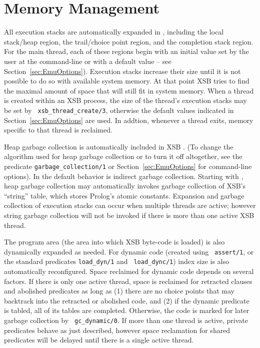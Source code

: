 
\section{Memory Management}\label{memory_management}
All execution stacks are automatically expanded in \version{},
including the local stack/heap region, the trail/choice point region,
and the completion stack region.  For the main thread, each of these
regions begin with an initial value set by the user at the
command-line or with a default value -- see
Section~\ref{sec:EmuOptions}).  Execution stacks increase their size
until it is not possible to do so with available system memory.  At
that point XSB tries to find the maximal amount of space that will
still fit in system memory.  When a thread is created within an XSB
process, the size of the thread's execution stacks may be set by {\tt
  xsb\_thread\_create/3}, otherwise the default values indicated in
Section~\ref{sec:EmuOptions} are used.  In addtion, whenever a thread
exits, memory specific to that thread is reclaimed.

Heap garbage collection is automatically included in XSB
\cite{CaSC01,CATmem@ISMM-98}.  (To change the algorithm used for heap
garbage collection or to turn it off altogether, see the predicate
{\tt garbage\_collection/1} or Section~\ref{sec:EmuOptions} for
command-line options).  In \version{} the default behavior is indirect
garbage collection.  Starting with \version{}, heap garbage collection
may automatically invokes garbage collection of XSB's ``string''
table, which stores Prolog's atomic constants.  Expansion and garbage
collection of execution stacks can occur when multiple threads are
active; however string garbage collection will not be invoked if there
is more than one active XSB thread.

The program area (the area into which XSB byte-code is loaded) is also
dynamically expanded as needed.  For dynamic code (created using {\tt
  assert/1}, or the standard predicates {\tt load\_dyn/1} and {\tt
  load\_dync/1}) index size is also automatically reconfigured.  Space
reclaimed for dynamic code depends on several factors.  If there is
only one active thread, space is reclaimed for retracted clauses and
abolished predicates as long as (1) there are no choice points that
may backtrack into the retracted or abolished code, and (2) if the
dynamic predicate is tabled, all of its tables are completed.
Otherwise, the code is marked for later garbage collection by {\tt
  gc\_dynamic/0}.  If more than one thread is active, private
predicates behave as just described, however space reclamation for
shared predicates will be delayed until there is a single active
thread.

